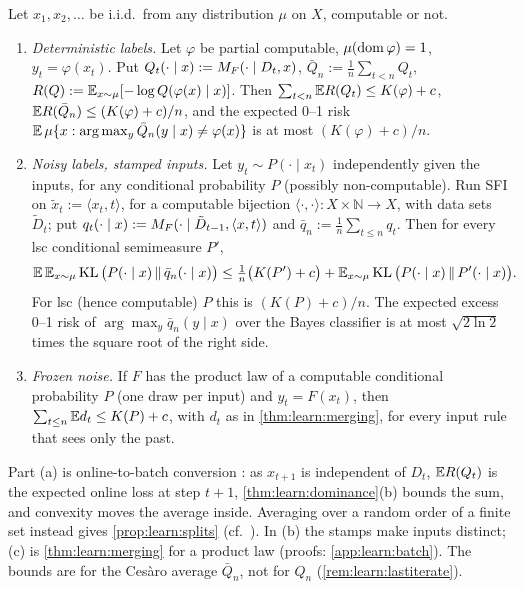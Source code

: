 \begin{theorem}\label{thm:learn:batch}
Let $x_1,x_2,\ldots$ be i.i.d.\ from any distribution $\mu$ on $X$, computable or not.
\begin{enumerate}[label=(\alph*),leftmargin=*]
\item \emph{Deterministic labels.} Let $\varphi$ be partial computable, $\mu(\operatorname{dom}\varphi)=1$, $y_t=\varphi(x_t)$. Put $Q_t(\cdot\mid x):=M_{F}(\cdot\mid D_t,x)$, $\bar Q_n:=\frac1n\sum_{t<n}Q_t$, $R(Q):=\mathbb{E}_{x\sim\mu}[-\log Q(\varphi(x)\mid x)]$. Then $\sum_{t<n}\mathbb{E} R(Q_t)\le K(\varphi)+c$, $\mathbb{E} R(\bar Q_n)\le(K(\varphi)+c)/n$, and the expected 0--1 risk $\mathbb{E}\,\mu\{x:\arg\max_y\bar Q_n(y\mid x)\ne\varphi(x)\}$ is at most $(K(\varphi)+c)/n$.
\item \emph{Noisy labels, stamped inputs.} Let $y_t\sim P(\cdot\mid x_t)$ independently given the inputs, for any conditional probability $P$ (possibly non-computable). Run SFI on $\tilde x_t:=\langle x_t,t\rangle$, for a computable bijection $\langle\cdot,\cdot\rangle:X\times\mathbb N\to X$, with data sets $\tilde D_t$; put $q_t(\cdot\mid x):=M_{F}(\cdot\mid\tilde D_{t-1},\langle x,t\rangle)$ and $\bar q_n:=\frac1n\sum_{t\le n}q_t$. Then for every lsc conditional semimeasure $P'$,
\[ \mathbb{E}\,\mathbb{E}_{x\sim\mu}\operatorname{KL}\big(P(\cdot\mid x)\,\|\,\bar q_n(\cdot\mid x)\big)\le\tfrac1n\big(K(P')+c\big)+\mathbb{E}_{x\sim\mu}\operatorname{KL}\big(P(\cdot\mid x)\,\|\,P'(\cdot\mid x)\big). \]
For lsc (hence computable) $P$ this is $(K(P)+c)/n$. The expected excess 0--1 risk of $\arg\max_y\bar q_n(y\mid x)$ over the Bayes classifier is at most $\sqrt{2\ln2}$ times the square root of the right side.
\item \emph{Frozen noise.} If $F$ has the product law of a computable conditional probability $P$ (one draw per input) and $y_t=F(x_t)$, then $\sum_{t\le n}\mathbb{E} d_t\le K(P)+c$, with $d_t$ as in \cref{thm:learn:merging}, for every input rule that sees only the past.
\end{enumerate}
\end{theorem}

Part (a) is online-to-batch conversion \citep{littlestone1989online,cesabianchi2004generalization}: as $x_{t+1}$ is independent of $D_t$, $\mathbb{E} R(Q_t)$ is the expected online loss at step $t+1$, \cref{thm:learn:dominance}(b) bounds the sum, and convexity moves the average inside. Averaging over a random order of a finite set instead gives \cref{prop:learn:splits} (cf.\ \citealp{haussler1994predicting}). In (b) the stamps make inputs distinct; (c) is \cref{thm:learn:merging} for a product law (proofs: \cref{app:learn:batch}). The bounds are for the Ces\`aro average $\bar Q_n$, not for $Q_n$ (\cref{rem:learn:lastiterate}).

